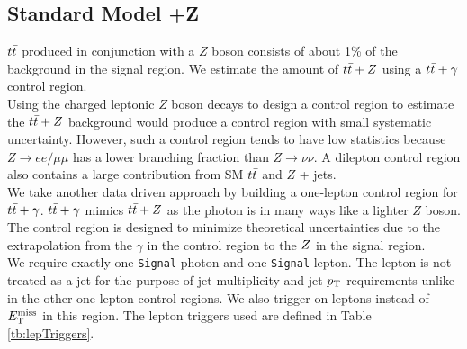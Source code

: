 \subsection{Standard Model \ttbar+Z}
\label{sec:Bkg:ttV}

\indent $t\bar{t}$ produced in conjunction with a $Z$ boson consists of about 1\% of the background in the signal region.  We estimate the amount of $t\bar{t}+Z$ using a $t\bar{t}+\gamma$ control region. \\

\indent Using the charged leptonic $Z$ boson decays to design a control region to estimate the $t\bar{t}+Z$ background would produce a control region with small systematic uncertainty. However, such a control region tends to have low statistics because $Z \rightarrow ee/\mu\mu$ has a lower branching fraction than $Z \rightarrow \nu\nu$.  A dilepton control region also contains a large contribution from SM $t\bar{t}$ and $Z$ + jets. \\

\indent We take another data driven approach by building a one-lepton control region for $t\bar{t}+\gamma$.  $t\bar{t}+\gamma$ mimics $t\bar{t}+Z$ as the photon is in many ways like a lighter $Z$ boson.  The control region is designed to minimize theoretical uncertainties due to the extrapolation from the $\gamma$ in the control region to the $Z$ in the signal region. \\

\indent We require exactly one {\tt Signal} photon and one {\tt Signal} lepton.  The lepton is not treated as a jet for the purpose of jet multiplicity and jet $p_{\mathrm{T}}$ requirements unlike in the other one lepton control regions.  We also trigger on leptons instead of $E_{\mathrm{T}}^{\mathrm{miss}}$ in this region. The lepton triggers used are defined in Table \ref{tb:lepTriggers}.  \\

